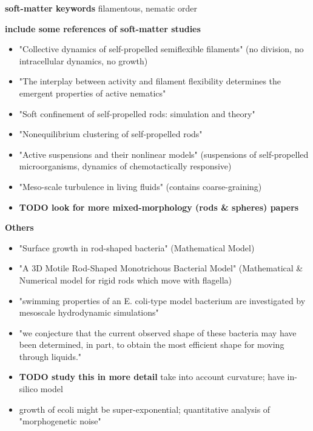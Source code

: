 \documentclass{article}
\begin{document}
\textbf{soft-matter keywords}
filamentous, nematic order

\textbf{include some references of soft-matter studies}
\begin{itemize}
    \item \cite{Duman2018} "Collective dynamics of self-propelled semiflexible filaments"
        (no division, no intracellular dynamics, no growth)
    \item \cite{Joshi2019} "The interplay between activity and filament flexibility determines the
        emergent properties of active nematics"
    \item \cite{Modica2024} "Soft confinement of self-propelled rods: simulation and theory"
    \item \cite{Peruani2006} "Nonequilibrium clustering of self-propelled rods"
    \item \cite{Saintillan2013} "Active suspensions and their nonlinear models" (suspensions of
        self-propelled microorganisms, dynamics of chemotactically responsive)
    \item \cite{Wensink2012} "Meso-scale turbulence in living fluids" (contains coarse-graining)
    \item \textbf{TODO look for more mixed-morphology (rods \& spheres) papers}
\end{itemize}

\textbf{Others}
\begin{itemize}
    \item \cite{Rosenberger1978} "Surface growth in rod-shaped bacteria" (Mathematical Model)
    \item \cite{Hsu2009} "A 3D Motile Rod-Shaped Monotrichous Bacterial Model" (Mathematical \&
        Numerical model for rigid rods which move with flagella)
    \item \cite{Hu2015} "swimming properties of an E. coli-type model bacterium are investigated by
        mesoscale hydrodynamic simulations"
    \item \cite{Cooper2006} "we conjecture that the current observed shape of these bacteria may
        have been determined, in part, to obtain the most efficient shape for moving through liquids."
    \item \cite{Schuech2019} \textbf{TODO study this in more detail} take into account curvature;
        have in-silico model
    \item \cite{Cylke2023} growth of \ac{ecoli} might be super-exponential; quantitative analysis of
        "morphogenetic noise"
\end{itemize}
\end{document}

